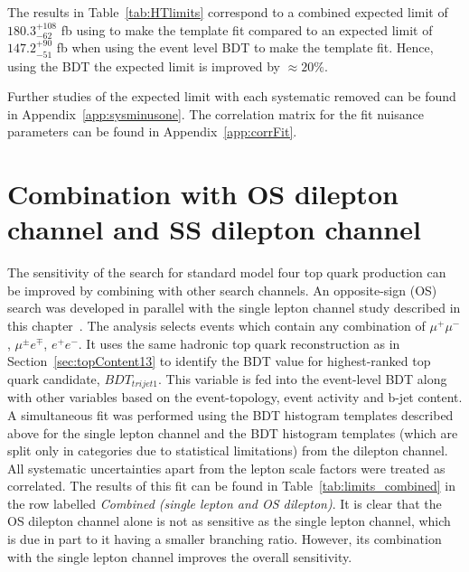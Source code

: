 The results in Table~\ref{tab:HTlimits} correspond to a combined expected limit of $180.3^{+108}_{-62}$ fb using \HT to make the template fit compared to an expected limit of $147.2^{+90}_{-51}$ fb when using the event level BDT to make the template fit. Hence, using the BDT the expected limit is improved by $\approx20\%$.

Further studies of the expected limit with each systematic removed can be found in Appendix~\ref{app:sysminusone}. The correlation matrix for the fit nuisance parameters can be found in Appendix~\ref{app:corrFit}.



\section{Combination with OS dilepton channel and SS dilepton channel ~\label{sec:combo13}}

The sensitivity of the search for standard model four top quark production can be improved by combining with other search channels. An opposite-sign (OS) search was developed in parallel with the single lepton channel study described in this chapter~\cite{CMS-PAS-TOP-16-016}. The analysis selects events which contain any combination of $\mu^{+}\mu^{-}$, $\mu^{\pm} e^{\mp}$, $e^{+}e^{-}$. It uses the same hadronic top quark reconstruction as in Section~\ref{sec:topContent13} to identify the BDT value for highest-ranked top quark candidate, $BDT_{trijet1}$. This variable is fed into the event-level BDT along with other variables based on the event-topology, event activity and b-jet content. A simultaneous fit was performed using the BDT histogram templates described above for the single lepton channel and the BDT histogram templates (which are split only in \njets categories due to statistical limitations) from the dilepton channel. All systematic uncertainties apart from the lepton scale factors were treated as correlated. The results of this fit can be found in Table~\ref{tab:limits_combined} in the row labelled \emph{Combined (single lepton and OS dilepton)}. It is clear that the OS dilepton channel alone is not as sensitive as the single lepton channel, which is due in part to it having a smaller branching ratio. However, its combination with the single lepton channel improves the overall sensitivity.\\


